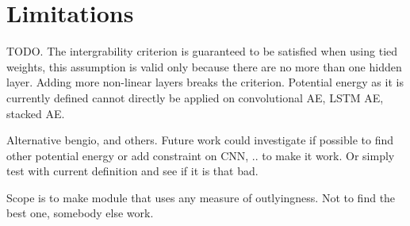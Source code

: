 
\section{Limitations}

TODO. The intergrability criterion is guaranteed to be satisfied when using tied weights, this assumption is valid only because there are no more than one hidden layer. Adding more non-linear layers breaks the criterion. Potential energy as it is currently defined cannot directly be applied on convolutional AE, LSTM AE, stacked AE.

Alternative bengio, and others. Future work could investigate if possible to find other potential energy or add constraint on CNN, .. to make it work. Or simply test with current definition and see if it is that bad. 

Scope is to make module that uses any measure of outlyingness. Not to find the best one, somebody else work.